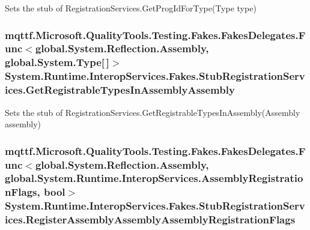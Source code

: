 Sets the stub of Registration\-Services.\-Get\-Prog\-Id\-For\-Type(\-Type type)

\hypertarget{class_system_1_1_runtime_1_1_interop_services_1_1_fakes_1_1_stub_registration_services_a4603927cc109ed31e6410d35639e1624}{
\subsubsection[{Get\-Registrable\-Types\-In\-Assembly\-Assembly}]{\setlength{\rightskip}{0pt plus 5cm}mqttf.\-Microsoft.\-Quality\-Tools.\-Testing.\-Fakes.\-Fakes\-Delegates.\-Func$<$global.\-System.\-Reflection.\-Assembly, global.\-System.\-Type\mbox{[}$\,$\mbox{]}$>$ System.\-Runtime.\-Interop\-Services.\-Fakes.\-Stub\-Registration\-Services.\-Get\-Registrable\-Types\-In\-Assembly\-Assembly}}\label{class_system_1_1_runtime_1_1_interop_services_1_1_fakes_1_1_stub_registration_services_a4603927cc109ed31e6410d35639e1624}


Sets the stub of Registration\-Services.\-Get\-Registrable\-Types\-In\-Assembly(\-Assembly assembly)

\hypertarget{class_system_1_1_runtime_1_1_interop_services_1_1_fakes_1_1_stub_registration_services_a4724fcb20e762d0185303007811c47c1}{
\subsubsection[{Register\-Assembly\-Assembly\-Assembly\-Registration\-Flags}]{\setlength{\rightskip}{0pt plus 5cm}mqttf.\-Microsoft.\-Quality\-Tools.\-Testing.\-Fakes.\-Fakes\-Delegates.\-Func$<$global.\-System.\-Reflection.\-Assembly, global.\-System.\-Runtime.\-Interop\-Services.\-Assembly\-Registration\-Flags, bool$>$ System.\-Runtime.\-Interop\-Services.\-Fakes.\-Stub\-Registration\-Services.\-Register\-Assembly\-Assembly\-Assembly\-Registration\-Flags}}\label{class_system_1_1_runtime_1_1_interop_services_1_1_fakes_1_1_stub_registration_services_a4724fcb20e762d0185303007811c47c1}


